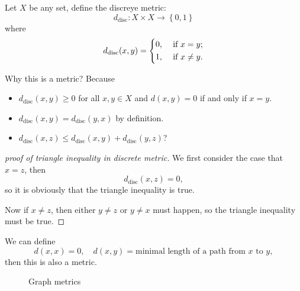 \begin{definition} \label{def: Discrete metric}
    Let \(X\) be any set, define the discreye metric:
    \[
        d_{\text{disc}}: X \times X \to \left\{ 0,1 \right\} 
    \] where 
    \[
        d_{\text{disc}}(x, y) = \begin{dcases}
            0 , &\text{ if } x = y ;\\
            1, &\text{ if }  x \neq y.
        \end{dcases}
    \]
\end{definition}
Why this is a metric? Because
\begin{itemize}
    \item \(d_{\text{disc}}(x, y) \ge 0\) for all \(x, y \in X\) and \(d(x, y) = 0\) if and only if \(x = y\). 
    \item \(d_{\text{disc}}(x, y) = d_{\text{disc}}(y, x)\) by definition. 
    \item \(d_{\text{disc}}(x, z) \le d_{\text{disc}} (x, y) + d_{\text{disc}}(y, z)\)?      
\end{itemize}

\begin{proof}[proof of triangle inequality in discrete metric]
    We first consider the case that \(x=z\), then 
    \[
        d_{\text{disc}}(x,z)=0,
    \]
    so it is obviously that the triangle inequality is true. 
    
    Now if \(x \neq z\), then either \(y \neq z\) or \(y \neq x\) must happen, so the triangle inequality must be true.   
\end{proof}

\begin{eg}
    We can define 
    \[
        d(x, x) = 0, \quad d(x, y) = \text{minimal length of a path from }x \text{ to } y,
    \] then this is also a metric.
\end{eg}
\begin{figure}[H]
    \centering
    \caption{Graph metrics}
    \label{fig:GraphMetric}
\end{figure}

